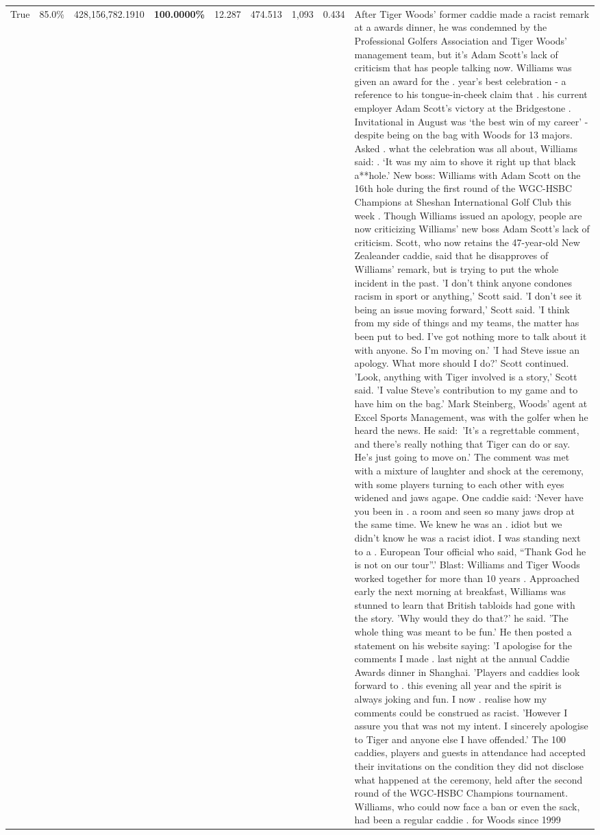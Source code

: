 \begin{table}[H]
\begin{tabular}{lllrlllll}
True & 85.0\% & 428,156,782.1910 & \bfseries \color{red} 100.0000\% & 12.287 & 474.513 & 1,093 & 0.434 & After Tiger Woods' former caddie made a racist remark at a awards dinner, he was condemned by the Professional Golfers Association and Tiger Woods' management team, but it's Adam Scott's lack of criticism that has people talking now. Williams was given an award for the . year’s best celebration - a reference to his tongue-in-cheek claim that . his current employer Adam Scott’s victory at the Bridgestone . Invitational in August was ‘the best win of my career’ - despite being on the bag with Woods for 13 majors. Asked . what the celebration was all about, Williams said: . ‘It was my aim to shove it right up that black a**hole.’ New boss: Williams with Adam Scott  on the 16th hole during the first round of the WGC-HSBC Champions at Sheshan International Golf Club this week . Though Williams issued an apology, people are now criticizing Williams' new boss Adam Scott's lack of criticism. Scott, who now retains the 47-year-old New Zealeander caddie, said that he disapproves of Williams' remark, but is trying to put the whole incident in the past. 'I don't think anyone condones racism in sport or anything,' Scott said. 'I don't see it being an issue moving forward,' Scott said. 'I think from my side of things and my teams, the matter has been put to bed. I've got nothing more to talk about it with anyone. So I'm moving on.' 'I had Steve issue an apology. What more should I do?' Scott continued. 'Look, anything with Tiger involved is a story,' Scott said. 'I value Steve's contribution to my game and to have him on the bag.' Mark Steinberg, Woods' agent at Excel Sports Management, was with the golfer when he heard the news. He said: 'It's a regrettable comment, and there's really nothing that Tiger can do or say. He's just going to move on.' The comment was met with a mixture of laughter and shock at the ceremony, with some players turning to each other with eyes widened and jaws agape. One caddie said: ‘Never have you been in . a room and seen so many jaws drop at the same time. We knew he was an . idiot but we didn’t know he was a racist idiot. I was standing next to a . European Tour official who said, “Thank God he is not on our tour”.’ Blast: Williams and Tiger Woods worked together for more than 10 years . Approached early the next morning at breakfast, Williams was stunned to learn that British tabloids had gone with the story. 'Why would they do that?' he said. 'The whole thing was meant to be fun.' He then posted a statement on his website saying: 'I apologise for the comments I made . last night at the annual Caddie Awards dinner in Shanghai. 'Players and caddies look forward to . this evening all year and the spirit is always joking and fun. I now . realise how my comments could be construed as racist. 'However I assure you that was not my intent. I sincerely apologise to Tiger and anyone else I have offended.' The 100 caddies, players and guests in attendance had accepted their invitations on the condition they did not disclose what happened at the ceremony, held after the second round of the WGC-HSBC Champions tournament. Williams, who could now face a ban or even the sack, had been a regular caddie . for Woods since 1999 
\end{tabular}
\end{table}
